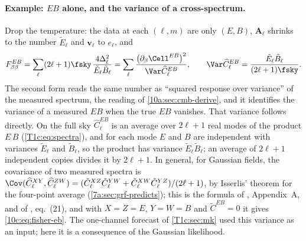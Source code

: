 \paragraph{Example: $EB$ alone, and the variance of a cross-spectrum.} Drop the temperature: the data at each
$(\ell,m)$ are only $(E,B)$, $\bm A_\ell$ shrinks to the number $\tilde E_\ell$ and $\bm v_\ell$ to $e_\ell$, and
\begin{equation}
  F^{EB}_{\beta\beta}=\sum_\ell(2\ell+1)\fsky\,\frac{4\Delta_\ell^2}{\tilde E_\ell\tilde B_\ell}
  =\sum_\ell\frac{\bigl(\partial_\beta\Cell^{EB}\bigr)^2}{\Var\widehat C^{EB}_\ell},
  \qquad
  \Var\widehat C^{EB}_\ell=\frac{\tilde E_\ell\tilde B_\ell}{(2\ell+1)\fsky}.
  \label{10c:eq:fisher-eb}
\end{equation}
The second form reads the same number as ``squared response over variance'' of the measured spectrum, the reading
of \cref{10a:sec:cmb-derive}, and it identifies the variance of a measured $EB$ when the true $EB$ vanishes. That
variance follows directly. On the full sky $\widehat C^{EB}_\ell$ is an average over $2\ell+1$ real modes of the
product $E\,B$ (\cref{T1c:eq:spectra}), and for each mode $E$ and $B$ are independent with variances $\tilde E_\ell$ and
$\tilde B_\ell$, so the product has variance $\tilde E_\ell\tilde B_\ell$; an average of $2\ell+1$ independent copies
divides it by $2\ell+1$. In general, for Gaussian fields, the covariance of two measured spectra is
$\Cov(\widehat C^{XY}_\ell,\widehat C^{ZW}_\ell)=(\tilde C^{XZ}_\ell\tilde C^{YW}_\ell+\tilde C^{XW}_\ell\tilde C^{YZ}_\ell)/(2\ell+1)$, by
Isserlis' theorem for the four-point average (\cref{7a:sec:grf-predicts}); this is the formula of
\cite{Minami2019}, Appendix~A, and of \cite{EskiltKomatsu2022}, eq.~(21), and with $X=Z=E$, $Y=W=B$ and
$\tilde C^{EB}=0$ it gives \eqref{10c:eq:fisher-eb}. The one-channel forecast of \cref{T1c:sec:mk} used this variance
as an input; here it is a consequence of the Gaussian likelihood.

